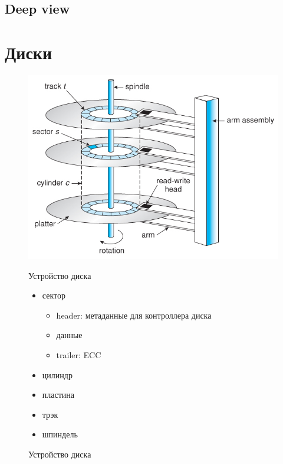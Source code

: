 \documentclass[../../lectures.tex]{subfiles}
\begin{document}
\subsection{Deep view}

\section{Диски}
\begin{figure}[H]
\begin{minipage}[c]{0.6\linewidth}
\centering
\includegraphics[width=\textwidth]{images/disk-mechanism.jpg}
\caption{Устройство диска}
\end{minipage}
\begin{minipage}[c]{0.4\linewidth}
\centering
Устройство диска
\begin{itemize}
  \item сектор
        \begin{itemize}
            \item header: метаданные для контроллера диска
            \item данные
            \item trailer: ECC
        \end{itemize}
  \item цилиндр
  \item пластина
  \item трэк
  \item шпиндель
\end{itemize}
\end{minipage}
\end{figure}
\end{document}
